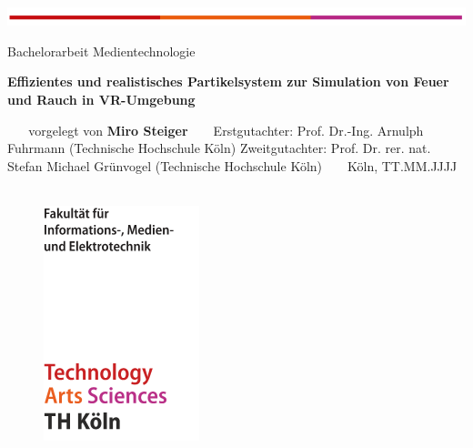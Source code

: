 \documentclass[a4paper,11pt]{article} %
\renewcommand{\\}{\vspace*{0.5\baselineskip} \newline}
\begin{document}
\begin{titlepage}
	\begin{flushleft}
		\includegraphics[width=\textwidth]{Grafiken/TH/TH.png}\\
		\vspace*{2cm}
	\end{flushleft}

	\begin{flushleft}
		Bachelorarbeit Medientechnologie
	\end{flushleft}

	\begin{huge}
		\noindent
		\bfseries
		Effizientes und realistisches Partikelsystem zur Simulation von Feuer und Rauch in VR-Umgebung \\
	\end{huge}
	~\\
	~\\
	\noindent
	vorgelegt von                   \\
	\textbf{Miro Steiger}			\\
	~\\
	~\\
	\noindent
	Erstgutachter: Prof. Dr.-Ing. Arnulph Fuhrmann (Technische Hochschule Köln)              \\
	Zweitgutachter:  Prof. Dr. rer. nat. Stefan Michael Grünvogel (Technische Hochschule Köln)
	~\\
	~\\
	Köln, TT.MM.JJJJ
	~\\
	~\\
	\begin{figure}[b]
		\begin{flushright}
			\includegraphics[scale=1]{Grafiken/TH/TH_F07_cover.png}\\
		\end{flushright}
	\end{figure}

	\pagestyle{fancy}
\end{titlepage}
\end{document}
